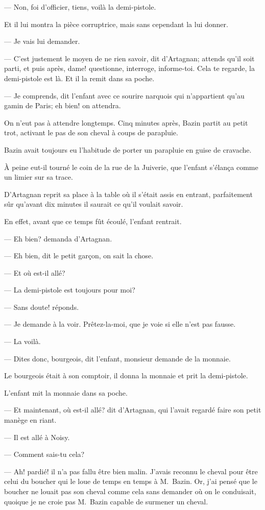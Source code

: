 — Non, foi d'officier, tiens, voilà la demi-pistole.

Et il lui montra la pièce corruptrice, mais sans cependant la lui donner.

— Je vais lui demander.

— C'est justement le moyen de ne rien savoir, dit d'Artagnan; attends qu'il soit parti, et puis après, dame! questionne, interroge, informe-toi. Cela te regarde, la demi-pistole est là. Et il la remit dans sa poche.

— Je comprends, dit l'enfant avec ce sourire narquois qui n'appartient qu'au gamin de Paris; eh bien! on attendra.

On n'eut pas à attendre longtemps. Cinq minutes après, Bazin partit au petit trot, activant le pas de son cheval à coups de parapluie.

Bazin avait toujours eu l'habitude de porter un parapluie en guise de cravache.

À peine eut-il tourné le coin de la rue de la Juiverie, que l'enfant s'élança comme un limier sur sa trace.

D'Artagnan reprit sa place à la table où il s'était assis en entrant, parfaitement sûr qu'avant dix minutes il saurait ce qu'il voulait savoir.

En effet, avant que ce temps fût écoulé, l'enfant rentrait.

— Eh bien? demanda d'Artagnan.

— Eh bien, dit le petit garçon, on sait la chose.

— Et où est-il allé?

— La demi-pistole est toujours pour moi?

— Sans doute! réponds.

— Je demande à la voir. Prêtez-la-moi, que je voie si elle n'est pas fausse.

— La voilà.

— Dites donc, bourgeois, dit l'enfant, monsieur demande de la monnaie.

Le bourgeois était à son comptoir, il donna la monnaie et prit la demi-pistole.

L'enfant mit la monnaie dans sa poche.

— Et maintenant, où est-il allé? dit d'Artagnan, qui l'avait regardé faire son petit manège en riant.

— Il est allé à Noisy.

— Comment sais-tu cela?

— Ah! pardié! il n'a pas fallu être bien malin. J'avais reconnu le cheval pour être celui du boucher qui le loue de temps en temps à M.~Bazin. Or, j'ai pensé que le boucher ne louait pas son cheval comme cela sans demander où on le conduisait, quoique je ne croie pas M.~Bazin capable de surmener un cheval.

